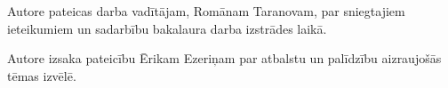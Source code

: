﻿Autore pateicas darba vadītājam, Romānam Taranovam, par sniegtajiem ieteikumiem un sadarbību bakalaura darba izstrādes laikā.

Autore izsaka pateicību Ērikam Ezeriņam par atbalstu un  palīdzību aizraujošās tēmas izvēlē.